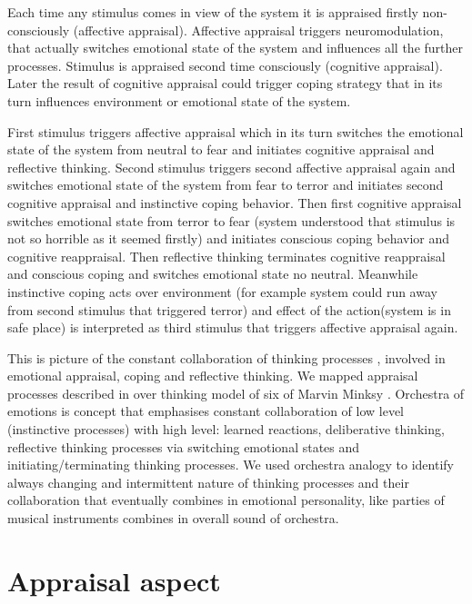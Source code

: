 Each time any stimulus comes in view of the system it is appraised firstly non-consciously (affective appraisal). Affective appraisal triggers neuromodulation, that actually switches emotional state of the system and influences all the further processes. Stimulus is appraised second time consciously (cognitive appraisal). Later the result of cognitive appraisal could trigger coping strategy that in its turn influences environment or emotional state of the system.

First stimulus triggers affective appraisal which in its turn switches the emotional state of the system from neutral to fear and initiates cognitive appraisal and reflective thinking. Second stimulus triggers second affective appraisal again and switches emotional state of the system from fear to terror and initiates second cognitive appraisal and instinctive coping behavior. Then first cognitive appraisal switches emotional state from terror to fear (system understood that stimulus is not so horrible as it seemed firstly) and initiates conscious coping behavior and cognitive reappraisal. Then reflective thinking terminates cognitive reappraisal and conscious coping and switches emotional state no neutral. Meanwhile instinctive coping acts over environment (for example system could run away from second stimulus that triggered terror) and effect of the action(system is in safe place) is interpreted as third stimulus that triggers affective appraisal again.

This is picture of the constant collaboration of thinking processes \cite{emotionmachine}, involved in emotional appraisal, coping and reflective thinking. We mapped appraisal processes described in \cite{putting_appraisal_in_context, appraisal_determinants_of_emotions, appraisal_considered_as_a_process} over thinking model of six of Marvin Minksy \cite{emotionmachine}. Orchestra of emotions is concept that emphasises constant collaboration of low level (instinctive processes) with high level: learned reactions, deliberative thinking, reflective thinking processes via switching emotional states and initiating/terminating thinking processes. We used orchestra analogy to identify always changing and intermittent nature of thinking processes and their  collaboration that eventually combines in emotional personality, like parties of musical instruments combines in overall sound of orchestra.

\section{Appraisal aspect}


